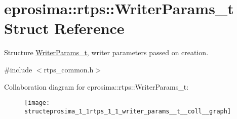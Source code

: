 \hypertarget{structeprosima_1_1rtps_1_1_writer_params__t}{\section{eprosima\-:\-:rtps\-:\-:\-Writer\-Params\-\_\-t \-Struct \-Reference}
\label{structeprosima_1_1rtps_1_1_writer_params__t}
}


\-Structure \hyperlink{structeprosima_1_1rtps_1_1_writer_params__t}{\-Writer\-Params\-\_\-t}, writer parameters passed on creation.  




{\ttfamily \#include $<$rtps\-\_\-common.\-h$>$}



\-Collaboration diagram for eprosima\-:\-:rtps\-:\-:\-Writer\-Params\-\_\-t\-:
\nopagebreak
\begin{figure}[H]
\begin{center}
\leavevmode
\texttt{[image: structeprosima\_1\_1rtps\_1\_1\_writer\_params\_\_t\_\_coll\_\_graph]}
\end{center}
\end{figure}
